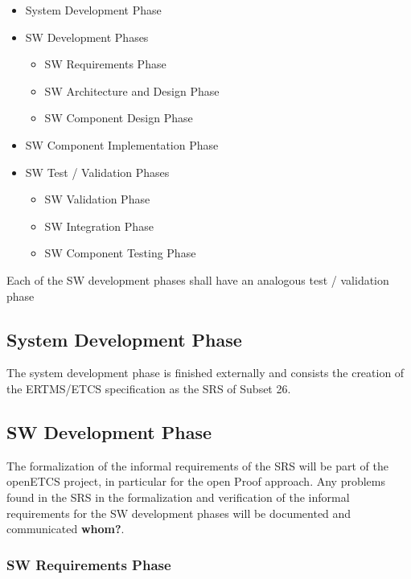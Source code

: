 \begin{itemize}
\item System Development Phase
\item SW Development Phases
  \begin{itemize}
  \item SW Requirements Phase
  \item SW Architecture and Design Phase
  \item SW Component Design Phase
  \end{itemize}
\item SW Component Implementation Phase
\item SW Test / Validation Phases
  \begin{itemize}
  \item SW Validation Phase
  \item SW Integration Phase
  \item SW Component Testing Phase
  \end{itemize}
\end{itemize}

Each of the SW development phases shall have an analogous test / validation
phase

\subsection{System Development Phase}
\label{sec:syst-devel-phase}

The system development phase is finished externally and consists the creation of
the ERTMS/ETCS specification as the SRS of Subset 26.

\subsection{SW Development Phase}
\label{sec:sw-development-phase}

The formalization of the informal requirements of the SRS will be part of the
openETCS project, in particular for the open Proof approach. Any problems found
in the SRS in the formalization and verification of the informal requirements
for the SW development phases will be documented and communicated {\bf
  whom?}. %

\subsubsection{SW Requirements Phase}
\label{sec:sw-requ-phase}




